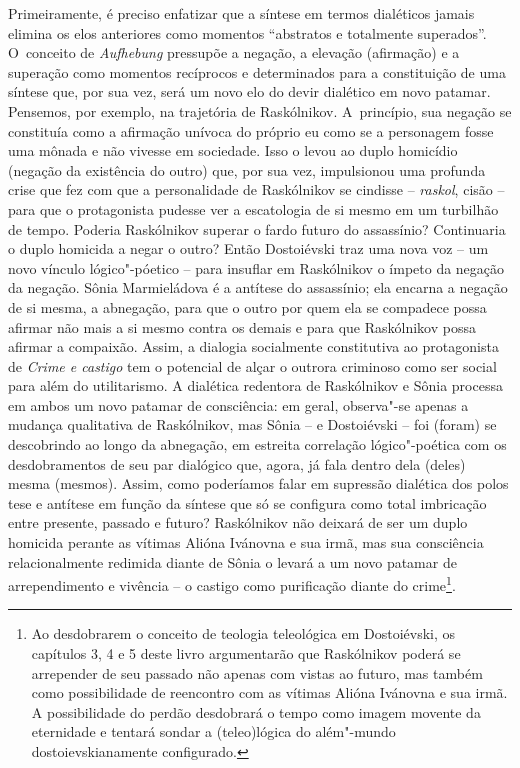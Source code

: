 {{Primeiramente, é preciso enfatizar que a síntese em termos dialéticos
jamais elimina os elos anteriores como momentos ``abstratos e totalmente
superados''. O~conceito de \emph{Aufhebung} pressupõe a negação, a
elevação (afirmação) e a superação como momentos recíprocos e
determinados para a constituição de uma síntese que, por sua vez, será
um novo elo do devir dialético em novo patamar. Pensemos, por exemplo,
na trajetória de Raskólnikov. A~princípio, sua negação se constituía
como a afirmação unívoca do próprio eu como se a personagem fosse uma
mônada e não vivesse em sociedade. Isso o levou ao duplo homicídio
(negação da existência do outro) que, por sua vez, impulsionou uma
profunda crise que fez com que a personalidade de Raskólnikov se
cindisse -- \emph{raskol}, cisão -- para que o protagonista pudesse ver
a escatologia de si mesmo em um turbilhão de tempo. Poderia Raskólnikov
superar o fardo futuro do assassínio? Continuaria o duplo homicida a
negar o outro? Então Dostoiévski traz uma nova voz -- um novo vínculo
lógico"-póetico -- para insuflar em Raskólnikov o ímpeto da negação da
negação. Sônia Marmieládova é a antítese do assassínio; ela encarna a
negação de si mesma, a abnegação, para que o outro por quem ela se
compadece possa afirmar não mais a si mesmo contra os demais e para que
Raskólnikov possa afirmar a compaixão. Assim, a dialogia socialmente
constitutiva ao protagonista de \emph{Crime e castigo} tem o potencial
de alçar o outrora criminoso como ser social para além do utilitarismo.
A dialética redentora de Raskólnikov e Sônia processa em ambos um novo
patamar de consciência: em geral, observa"-se apenas a mudança
qualitativa de Raskólnikov, mas Sônia -- e Dostoiévski -- foi (foram) se
descobrindo ao longo da abnegação, em estreita correlação lógico"-poética
com os desdobramentos de seu par dialógico que, agora, já fala dentro
dela (deles) mesma (mesmos). Assim, como poderíamos falar em supressão
dialética dos polos tese e antítese em função da síntese que só se
configura como total imbricação entre presente, passado e futuro?
Raskólnikov não deixará de ser um duplo homicida perante as vítimas
Alióna Ivánovna e sua irmã, mas sua consciência relacionalmente redimida
diante de Sônia o levará a um novo patamar de arrependimento e vivência
-- o castigo como purificação diante do crime\footnote{Ao desdobrarem o
  conceito de teologia teleológica em Dostoiévski, os capítulos 3, 4 e 5
  deste livro argumentarão que Raskólnikov poderá se arrepender de seu
  passado não apenas com vistas ao futuro, mas também como possibilidade
  de reencontro com as vítimas Alióna Ivánovna e sua irmã. A
  possibilidade do perdão desdobrará o tempo como imagem movente da
  eternidade e tentará sondar a (teleo)lógica do além"-mundo
  dostoievskianamente configurado.}.

}}
